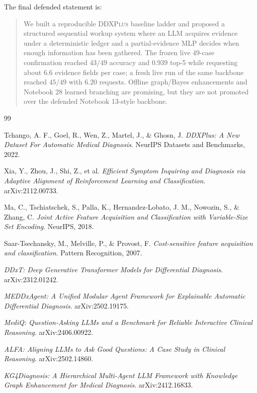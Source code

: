 \documentclass[11pt]{article}
\newcommand{\ddx}{\textsc{DDXPlus}}
\newcommand{\mlp}{\textsc{MLP}}
\newcommand{\llm}{\textsc{LLM}}
\begin{document}
The final defended statement is:
\begin{quote}
We built a reproducible \ddx{} baseline ladder and proposed a structured sequential workup system where an \llm{} acquires evidence under a deterministic ledger and a partial-evidence \mlp{} decides when enough information has been gathered. The frozen live 49-case confirmation reached $43/49$ accuracy and $0.939$ top-5 while requesting about $6.6$ evidence fields per case; a fresh live run of the same backbone reached $45/49$ with $6.20$ requests. Offline graph/Bayes enhancements and Notebook 28 learned branching are promising, but they are not promoted over the defended Notebook 13-style backbone.
\end{quote}

\newpage
\begin{thebibliography}{99}

Tchango, A. F., Goel, R., Wen, Z., Martel, J., \& Ghosn, J.
\newblock \emph{DDXPlus: A New Dataset For Automatic Medical Diagnosis}.
\newblock NeurIPS Datasets and Benchmarks, 2022.

Xia, Y., Zhou, J., Shi, Z., et al.
\newblock \emph{Efficient Symptom Inquiring and Diagnosis via Adaptive Alignment of Reinforcement Learning and Classification}.
\newblock arXiv:2112.00733.

Ma, C., Tschiatschek, S., Palla, K., Hernandez-Lobato, J. M., Nowozin, S., \& Zhang, C.
\newblock \emph{Joint Active Feature Acquisition and Classification with Variable-Size Set Encoding}.
\newblock NeurIPS, 2018.

Saar-Tsechansky, M., Melville, P., \& Provost, F.
\newblock \emph{Cost-sensitive feature acquisition and classification}.
\newblock Pattern Recognition, 2007.

\emph{DDxT: Deep Generative Transformer Models for Differential Diagnosis}.
\newblock arXiv:2312.01242.

\emph{MEDDxAgent: A Unified Modular Agent Framework for Explainable Automatic Differential Diagnosis}.
\newblock arXiv:2502.19175.

\emph{MediQ: Question-Asking LLMs and a Benchmark for Reliable Interactive Clinical Reasoning}.
\newblock arXiv:2406.00922.

\emph{ALFA: Aligning LLMs to Ask Good Questions: A Case Study in Clinical Reasoning}.
\newblock arXiv:2502.14860.

\emph{KG4Diagnosis: A Hierarchical Multi-Agent LLM Framework with Knowledge Graph Enhancement for Medical Diagnosis}.
\newblock arXiv:2412.16833.


\end{thebibliography}
\end{document}
